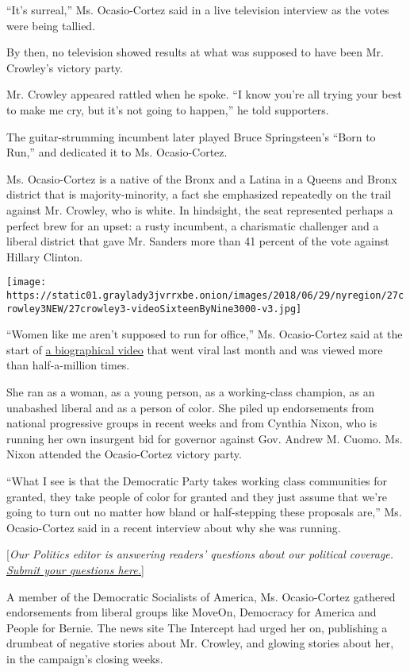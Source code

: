 ``It's surreal,'' Ms. Ocasio-Cortez said in a live television interview
as the votes were being tallied.

By then, no television showed results at what was supposed to have been
Mr. Crowley's victory party.

Mr. Crowley appeared rattled when he spoke. ``I know you're all trying
your best to make me cry, but it's not going to happen,'' he told
supporters.

The guitar-strumming incumbent later played Bruce Springsteen's ``Born
to Run,'' and dedicated it to Ms. Ocasio-Cortez.

Ms. Ocasio-Cortez is a native of the Bronx and a Latina in a Queens and
Bronx district that is majority-minority, a fact she emphasized
repeatedly on the trail against Mr. Crowley, who is white. In hindsight,
the seat represented perhaps a perfect brew for an upset: a rusty
incumbent, a charismatic challenger and a liberal district that gave Mr.
Sanders more than 41 percent of the vote against Hillary Clinton.

\texttt{[image: https://static01.graylady3jvrrxbe.onion/images/2018/06/29/nyregion/27crowley3NEW/27crowley3-videoSixteenByNine3000-v3.jpg]}

``Women like me aren't supposed to run for office,'' Ms. Ocasio-Cortez
said at the start of
\href{https://twitter.com/Ocasio2018/status/1001795660524457985}{a
biographical video} that went viral last month and was viewed more than
half-a-million times.

She ran as a woman, as a young person, as a working-class champion, as
an unabashed liberal and as a person of color. She piled up endorsements
from national progressive groups in recent weeks and from Cynthia Nixon,
who is running her own insurgent bid for governor against Gov. Andrew M.
Cuomo. Ms. Nixon attended the Ocasio-Cortez victory party.

``What I see is that the Democratic Party takes working class
communities for granted, they take people of color for granted and they
just assume that we're going to turn out no matter how bland or
half-stepping these proposals are,'' Ms. Ocasio-Cortez said in a recent
interview about why she was running.

{[}\emph{Our Politics editor is answering readers' questions about our
political coverage.}
\href{https://www.nytimes3xbfgragh.onion/2018/06/26/reader-center/politics-election-coverage.html}{\emph{Submit
your questions here.}}{]}

A member of the Democratic Socialists of America, Ms. Ocasio-Cortez
gathered endorsements from liberal groups like MoveOn, Democracy for
America and People for Bernie. The news site The Intercept had urged her
on, publishing a drumbeat of negative stories about Mr. Crowley, and
glowing stories about her, in the campaign's closing weeks.

